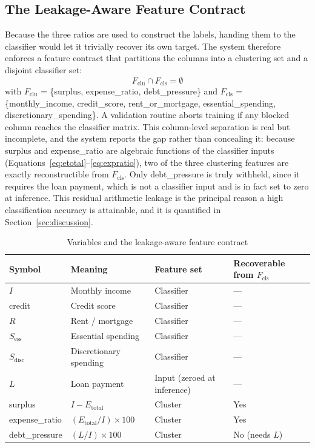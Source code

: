 \subsection{The Leakage-Aware Feature Contract}\label{subsec:contract}
Because the three ratios are used to construct the labels, handing them to the classifier
would let it trivially recover its own target. The system therefore enforces a feature
contract that partitions the columns into a clustering set and a disjoint classifier set:
\begin{equation}\label{eq:contract}
F_{\text{clu}} \cap F_{\text{cls}} = \emptyset
\end{equation}
with $F_{\text{clu}}$ = \{surplus, expense\_ratio, debt\_pressure\} and $F_{\text{cls}}$
= \{monthly\_income, credit\_score, rent\_or\_mortgage, essential\_spending,
discretionary\_spending\}. A validation routine aborts training if any blocked column
reaches the classifier matrix. This column-level separation is real but incomplete, and
the system reports the gap rather than concealing it: because surplus and expense\_ratio
are algebraic functions of the classifier inputs
(Equations~\eqref{eq:etotal}--\eqref{eq:expratio}), two of the three clustering features
are exactly reconstructible from $F_{\text{cls}}$. Only debt\_pressure is truly withheld,
since it requires the loan payment, which is not a classifier input and is in fact set to
zero at inference. This residual arithmetic leakage is the principal reason a high
classification accuracy is attainable, and it is quantified in
Section~\ref{sec:discussion}.

\begin{table}[t]
\centering
\caption{Variables and the leakage-aware feature contract}
\label{tab:contract}
\begin{tabularx}{\linewidth}{@{}l L L >{\centering\arraybackslash}p{2.3cm}@{}}
\toprule
Symbol & Meaning & Feature set & Recoverable from $F_{\text{cls}}$ \\
\midrule
$I$ & Monthly income & Classifier & --- \\
credit & Credit score & Classifier & --- \\
$R$ & Rent / mortgage & Classifier & --- \\
$S_{\text{ess}}$ & Essential spending & Classifier & --- \\
$S_{\text{disc}}$ & Discretionary spending & Classifier & --- \\
$L$ & Loan payment & Input (zeroed at inference) & --- \\
surplus & $I - E_{\text{total}}$ & Cluster & Yes \\
expense\_ratio & $(E_{\text{total}} / I) \times 100$ & Cluster & Yes \\
debt\_pressure & $(L / I) \times 100$ & Cluster & No (needs $L$) \\
\bottomrule
\end{tabularx}
\end{table}

